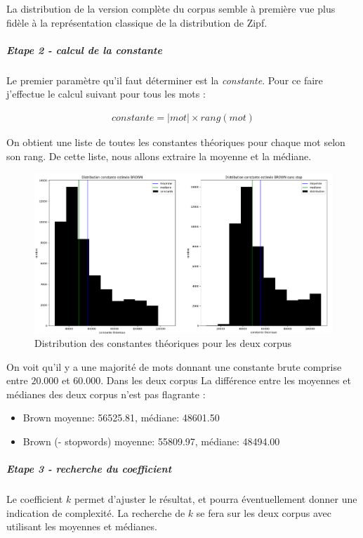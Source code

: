     		La distribution de la version complète du corpus semble à première vue plus fidèle à la représentation classique de la distribution de Zipf. 

		\subparagraph{Etape 2 - calcul de la constante}
			Le premier paramètre qu'il faut déterminer est la \emph{constante}. Pour ce faire j'effectue le calcul suivant pour tous les mots :

			\begin{align*}
				constante = |mot| \times rang(mot)
			\end{align*}

			On obtient une liste de toutes les constantes théoriques pour chaque mot selon son rang.
			De cette liste, nous allons extraire la moyenne et la médiane.

			\begin{figure}[H]
				\includegraphics[width=\linewidth]{img/distribContTh.png}
				\caption{Distribution des constantes théoriques pour les deux corpus}
			\end{figure}

			On voit qu'il y a une majorité de mots donnant une constante brute comprise entre $20.000$ et $60.000$. Dans les deux corpus
			La différence entre les moyennes et médianes des deux corpus n'est pas flagrante :
			\begin{itemize}
				\item Brown moyenne: 56525.81, médiane: 48601.50
				\item Brown (- stopwords) moyenne: 55809.97, médiane: 48494.00
			\end{itemize}


		\subparagraph{Etape 3 - recherche du coefficient}
			Le coefficient $k$ permet d'ajuster le résultat, et pourra éventuellement donner une indication de complexité. La recherche de $k$ se fera sur les deux corpus avec utilisant les moyennes et médianes.\\

